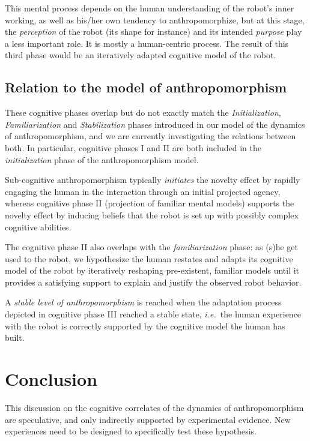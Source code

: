 \documentclass{sig-alternate-2013}
\newcommand{\ie}{{\textit{i.e.~}}}
\begin{document}
This mental process depends on the human understanding of the robot's
inner working, as well as his/her own tendency to anthropomorphize, but at this
stage, the \emph{perception} of the robot (its shape for instance) and its
intended \emph{purpose} play a less important role. It is mostly a human-centric
process.  The result of this third phase would be an iteratively adapted
cognitive model of the robot.

\subsection*{Relation to the model of anthropomorphism}

These cognitive phases overlap but do not exactly match the
\emph{Initialization}, \emph{Familiarization} and \emph{Stabilization} phases
introduced in our model of the dynamics of anthropomorphism, and we are
currently investigating the relations between both. In particular, cognitive
phases I and II are both included in the \emph{initialization} phase of the
anthropomorphism model.

Sub-cognitive anthropomorphism typically \emph{initiates} the novelty effect by
rapidly engaging the human in the interaction through an initial projected
agency, whereas cognitive phase II (projection of familiar mental models)
supports the novelty effect by inducing beliefs that the robot is set up with
possibly complex cognitive abilities.

The cognitive phase II also overlaps with the \emph{familiarization} phase: as
(s)he get used to the robot, we hypothesize the human restates and adapts its
cognitive model of the robot by iteratively reshaping pre-existent, familiar
models until it provides a satisfying support to explain and justify the
observed robot behavior.

A \emph{stable level of anthropomorphism} is reached when the adaptation process
depicted in cognitive phase III reached a stable state, \ie the human experience
with the robot is correctly supported by the cognitive model the human has
built.

\section{Conclusion}
\label{sec:conclusion}

This discussion on the cognitive correlates of the dynamics of anthropomorphism
are speculative, and only indirectly supported by experimental evidence. New
experiences need to be designed to specifically test these
hypothesis.
\end{document}
